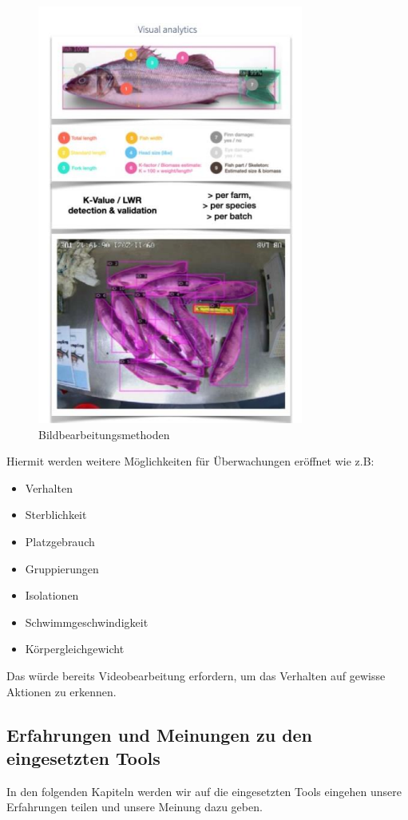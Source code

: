 \documentclass[../main.tex]{subfiles}
\begin{document}
	\begin{figure}[H]
		\centering
		\includegraphics{../images/Imageprocessing} 
		\caption{Bildbearbeitungsmethoden}
		\label{fig:Imageprocessing}
	\end{figure}
	
	\par \noindent
	Hiermit werden weitere Möglichkeiten für Überwachungen eröffnet wie z.B:
	
	\begin{itemize}
	 	\item Verhalten 
	 	\item Sterblichkeit
	 	\item Platzgebrauch
	 	\item Gruppierungen
	 	\item Isolationen
	 	\item Schwimmgeschwindigkeit
	 	\item Körpergleichgewicht
	\end{itemize}
\noindent
	Das würde bereits Videobearbeitung erfordern, um das Verhalten auf gewisse Aktionen zu erkennen. 

	
	\subsection{Erfahrungen und Meinungen zu den eingesetzten Tools}
	In den folgenden Kapiteln werden wir auf die eingesetzten Tools eingehen unsere Erfahrungen teilen und unsere Meinung dazu geben.
	
\end{document}
